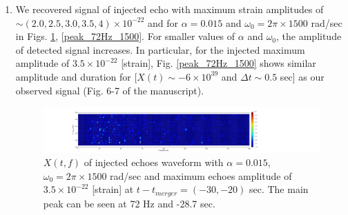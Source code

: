 \documentclass[12pt]{article}
\begin{document}
\begin{enumerate}
\item We recovered signal of injected echo with maximum strain amplitudes of $\sim (2.0, 2.5, 3.0, 3.5, 4) \times 10^{-22}$ and for $\alpha = 0.015$ and $\omega_{0}=2\pi \times 1500$ rad/sec in Figs. \ref{spectrogram_color_00}, \ref{peak_72Hz_1500}. For smaller values of  $\alpha$ and $\omega_{0}$, the amplitude of detected signal increases. In particular, for the injected maximum amplitude of $3.5 \times 10^{-22}$ [strain], Fig. \ref{peak_72Hz_1500} shows similar amplitude and duration for [$X(t) \sim -6 \times 10^{39}$ and $\Delta t \sim 0.5$ sec] as our observed signal (Fig. 6-7 of the manuscript).  
\begin{figure}[t]
\centering
    \includegraphics[width=1.0\textwidth]{spectrogram_color_alpha_0015.pdf}
 \caption{$X(t,f)$ of injected echoes waveform with $\alpha=0.015$, $\omega_{0}=2\pi \times 1500$ rad/sec and maximum echoes amplitude of $3.5 \times 10^{-22}$ [strain] at $t-t_{merger}=(-30,-20)$ sec. The main peak can be seen at 72 Hz and -28.7 sec. }
 \label{spectrogram_color_00}
\end{figure}



\end{enumerate}
\end{document}

